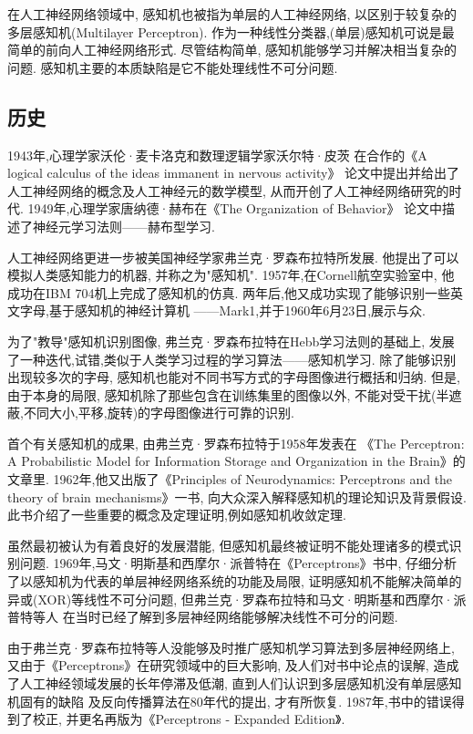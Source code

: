 \documentclass[a4paper,12pt]{article}
\begin{document}
			在人工神经网络领域中,
			感知机也被指为单层的人工神经网络,
			以区别于较复杂的多层感知机(Multilayer Perceptron).
			作为一种线性分类器,(单层)感知机可说是最简单的前向人工神经网络形式.
			尽管结构简单,
			感知机能够学习并解决相当复杂的问题.
			感知机主要的本质缺陷是它不能处理线性不可分问题.

		\subsection{历史}
			1943年,心理学家沃伦·麦卡洛克和数理逻辑学家沃尔特·皮茨
			在合作的《A logical calculus of the ideas immanent in nervous activity》
			论文中提出并给出了人工神经网络的概念及人工神经元的数学模型,
			从而开创了人工神经网络研究的时代.
			1949年,心理学家唐纳德·赫布在《The Organization of Behavior》
			论文中描述了神经元学习法则——赫布型学习.

			人工神经网络更进一步被美国神经学家弗兰克·罗森布拉特所发展.
			他提出了可以模拟人类感知能力的机器,
			并称之为"感知机".
			1957年,在Cornell航空实验室中,
			他成功在IBM 704机上完成了感知机的仿真.
			两年后,他又成功实现了能够识别一些英文字母,基于感知机的神经计算机
			——Mark1,并于1960年6月23日,展示与众.
			
			为了"教导"感知机识别图像,
			弗兰克·罗森布拉特在Hebb学习法则的基础上,
			发展了一种迭代,试错,类似于人类学习过程的学习算法——感知机学习.
			除了能够识别出现较多次的字母,
			感知机也能对不同书写方式的字母图像进行概括和归纳.
			但是,由于本身的局限,
			感知机除了那些包含在训练集里的图像以外,
			不能对受干扰(半遮蔽,不同大小,平移,旋转)的字母图像进行可靠的识别.
			
			首个有关感知机的成果,
			由弗兰克·罗森布拉特于1958年发表在
			《The Perceptron: A Probabilistic Model 
			for Information Storage and Organization in the Brain》的文章里.
			1962年,他又出版了《Principles of Neurodynamics: 
			Perceptrons and the theory of brain mechanisms》一书,
			向大众深入解释感知机的理论知识及背景假设.
			此书介绍了一些重要的概念及定理证明,例如感知机收敛定理.
			
			虽然最初被认为有着良好的发展潜能,
			但感知机最终被证明不能处理诸多的模式识别问题.
			1969年,马文·明斯基和西摩尔·派普特在《Perceptrons》书中,
			仔细分析了以感知机为代表的单层神经网络系统的功能及局限,
			证明感知机不能解决简单的异或(XOR)等线性不可分问题,
			但弗兰克·罗森布拉特和马文·明斯基和西摩尔·派普特等人
			在当时已经了解到多层神经网络能够解决线性不可分的问题.
			
			由于弗兰克·罗森布拉特等人没能够及时推广感知机学习算法到多层神经网络上,
			又由于《Perceptrons》在研究领域中的巨大影响,
			及人们对书中论点的误解,
			造成了人工神经领域发展的长年停滞及低潮,
			直到人们认识到多层感知机没有单层感知机固有的缺陷
			及反向传播算法在80年代的提出,
			才有所恢复.
			1987年,书中的错误得到了校正,
			并更名再版为《Perceptrons - Expanded Edition》.
			
\end{document}
